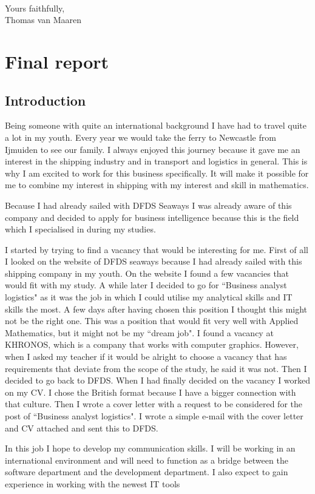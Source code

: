 \documentclass[titlepage]{article}
\begin{document}
\ 
\\
Yours faithfully,
\\
Thomas van Maaren
\section{Final report}
\subsection{Introduction}

Being someone with quite an international background I have had to travel quite
a lot in my youth. Every year we would take the ferry to Newcastle from
Ijmuiden to see our family. I always enjoyed this journey because it gave me
an interest in the shipping industry and in transport and logistics in general.
This is why I am excited to work for this business specifically. It will make
it possible for me to combine my interest in shipping with my interest and
skill in mathematics.

Because I had already sailed with DFDS Seaways I was already aware of this
company and decided to apply for business intelligence because this is the
field which I specialised in during my studies.

I started by trying to find a vacancy that would be interesting for me. First
of all I looked on the website of DFDS seaways because I had already sailed with this
shipping company in my youth. On the website I found a
few vacancies that would fit with my study. A while later I decided to go for
``Business analyst logistics" as it was the job in which I could utilise my
analytical skills and IT skills the most. A few days after having chosen
this position I thought this might not be the right one. This was a position
that would fit very well with Applied Mathematics, but it might not be my
``dream job". I found a vacancy at KHRONOS, which is a
company that works with computer graphics. However, when I asked my teacher if it
would be alright to choose a vacancy that has requirements that deviate from the
scope of the study, he said it was not. Then I decided to go back to DFDS.  When
I had finally decided on the vacancy I worked on my CV. I chose the British
format because I have a bigger connection with that culture.  Then I wrote a
cover letter with a request to be considered for the post of ``Business analyst
logistics". I wrote a simple e-mail with the cover letter and CV attached and
sent this to DFDS.

In this job I hope to develop my communication skills. I will be working in an
international environment and will need to function as a bridge between the
software department and the development department. I also expect to gain
experience in working with the newest IT tools 
\end{document}
